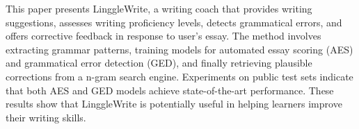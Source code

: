 This paper presents LinggleWrite, a writing coach that provides writing suggestions, assesses writing proficiency levels, detects grammatical errors, and offers corrective feedback in response to user's essay. The method involves extracting grammar patterns, training models for automated essay scoring (AES) and grammatical error detection (GED), and finally retrieving plausible corrections from a n-gram search engine. Experiments on public test sets indicate that both AES and GED models achieve state-of-the-art performance. These results show that LinggleWrite is potentially useful in helping learners improve their writing skills.
